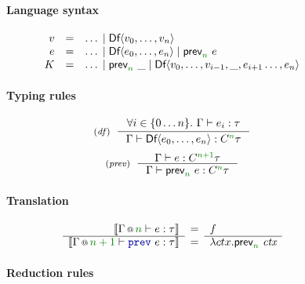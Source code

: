\begin{figure}[t]
\paragraph{Language syntax}

\begin{equation*}
\begin{array}{rcl}
v &=& \ldots \sep \ident{Df}\langle v_0, \ldots, v_n\rangle \\
e &=& \ldots \sep \ident{Df}\langle e_0, \ldots, e_n\rangle \sep \ident{prev}_{\cclrd{n}}~e\\
K &=& \ldots \sep \ident{prev}_{\cclrd{n}}~\_ \sep \ident{Df}\langle v_0, \ldots, v_{i-1}, \_, e_{i+1} \ldots, e_n\rangle
\end{array}
\end{equation*}

\vspace{1.25em}
\paragraph{Typing rules}

\begin{equation*}
\tyrule{df}
  { \forall i\in\{ 0 \ldots n \}. ~ \Gamma \vdash e_i : \tau}
  { \Gamma \vdash \ident{Df}\langle e_0, \ldots, e_n \rangle : \ctyp{\cclrd{n}}{\tau} }
\end{equation*}
\begin{equation*}
\tyrule{prev}
  { \Gamma \vdash e : \ctyp{\cclrd{n+1}}{\tau} }
  { \Gamma \vdash \ident{prev}_{\cclrd{n}}~e : \ctyp{\cclrd{n}}{\tau} }
\end{equation*}

\vspace{1.25em}
\paragraph{Translation}

\begin{equation*}
\semdeff
  { \coctx{\Gamma}{\cclrd{n}} \vdash e : \tau }
  { \coctx{\Gamma}{\cclrd{n+1}} \vdash \kvd{prev}~e : \tau }
  {f}
  {\lambda ctx.\ident{prev}_{\cclrd{n}}~\ctx }
\end{equation*}

\vspace{1.25em}
\paragraph{Reduction rules}


\end{figure}
